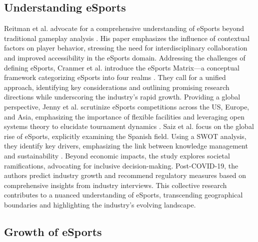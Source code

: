 \documentclass[manuscript,screen,review,anonymous]{acmart}
\begin{document}
\subsection{Understanding eSports}

Reitman et al. advocate for a comprehensive understanding of eSports beyond traditional gameplay analysis \cite{a19}. His paper emphasizes the influence of contextual factors on player behavior, stressing the need for interdisciplinary collaboration and improved accessibility in the eSports domain. Addressing the challenges of defining eSports, Cranmer et al. introduce the eSports Matrix—a conceptual framework categorizing eSports into four realms \cite{a2}. They call for a unified approach, identifying key considerations and outlining promising research directions while underscoring the industry's rapid growth. Providing a global perspective, Jenny et al. scrutinize eSports competitions across the US, Europe, and Asia, emphasizing the importance of flexible facilities and leveraging open systems theory to elucidate tournament dynamics \cite{a5}. Saiz et al. focus on the global rise of eSports, explicitly examining the Spanish field. Using a SWOT analysis, they identify key drivers, emphasizing the link between knowledge management and sustainability \cite{a21}. Beyond economic impacts, the study explores societal ramifications, advocating for inclusive decision-making. Post-COVID-19, the authors predict industry growth and recommend regulatory measures based on comprehensive insights from industry interviews. This collective research contributes to a nuanced understanding of eSports, transcending geographical boundaries and highlighting the industry's evolving landscape.

\subsection{Growth of eSports}
\end{document}
